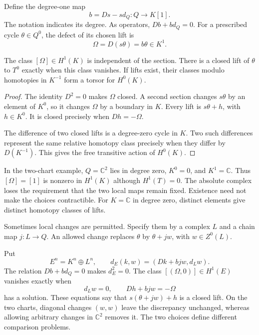 Define the degree-one map
\[
 b=D s-s d_Q:Q\longrightarrow K[1].
\]
The notation indicates its degree. As operators,
$D b+b d_Q=0$. For a prescribed cycle $\theta\in Q^0$, the defect
of its chosen lift is
\[
 \Omega=D(s\theta)=b\theta\in K^1.
\]

\begin{proposition}\label{mht:prop:relative-descent}
The class $[\Omega]\in H^1(K)$ is independent of the section.
There is a closed lift of $\theta$ to $T^0$ exactly when this class
vanishes. If lifts exist, their classes modulo homotopies in
$K^{-1}$ form a torsor for $H^0(K)$.
\end{proposition}

\begin{proof}
The identity $D^2=0$ makes $\Omega$ closed. A second section changes
$s\theta$ by an element of $K^0$, so it changes $\Omega$ by a
boundary in $K$. Every lift is $s\theta+h$, with $h\in K^0$.
It is closed precisely when $Dh=-\Omega$.

The difference of two closed lifts is a degree-zero cycle in $K$.
Two such differences represent the same relative homotopy class
precisely when they differ by $D(K^{-1})$. This gives the free
transitive action of $H^0(K)$.
\end{proof}

In the two-chart example, $Q=\mathbb C^2$ lies in degree zero,
$K^0=0$, and $K^1=\mathbb C$. Thus $[\Omega]=[1]$ is nonzero in
$H^1(K)$ although $H^1(T)=0$. The absolute complex loses the
requirement that the two local maps remain fixed.
Existence need not make the choices contractible. For
$K=\mathbb C$ in degree zero, distinct elements give distinct
homotopy classes of lifts.

Sometimes local changes are permitted. Specify them by a complex
$L$ and a chain map $j:L\to Q$. An allowed change replaces
$\theta$ by $\theta+jw$, with $w\in Z^0(L)$.

Put
\begin{equation}\label{mht:eq:allowed-change-complex}
 E^n=K^n\oplus L^n,
 \qquad d_E(k,w)=(Dk+bjw,d_Lw).
\end{equation}
The relation $Db+bd_Q=0$ makes $d_E^2=0$.
The class $[(\Omega,0)]\in H^1(E)$ vanishes exactly when
\[
 d_Lw=0,\qquad Dh+bjw=-\Omega
\]
has a solution. These equations say that $s(\theta+jw)+h$ is a
closed lift.
On the two charts, diagonal changes $(w,w)$ leave the
discrepancy unchanged, whereas allowing arbitrary changes in
$\mathbb C^2$ removes it. The two choices define different
comparison problems.

